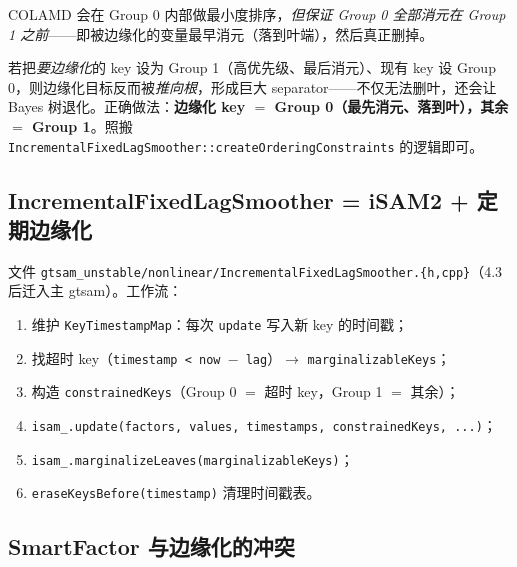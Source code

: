 \noindent COLAMD 会在 Group 0 内部做最小度排序，\emph{但保证 Group 0 全部消元在 Group 1 之前}——即被边缘化的变量最早消元（落到叶端），然后真正删掉。

\begin{pitfall}
若把\emph{要边缘化}的 key 设为 Group 1（高优先级、最后消元）、现有 key 设 Group 0，则边缘化目标反而被\emph{推向根}，形成巨大 separator——不仅无法删叶，还会让 Bayes 树退化。正确做法：\textbf{边缘化 key $=$ Group 0（最先消元、落到叶），其余 $=$ Group 1}。照搬 \texttt{IncrementalFixedLagSmoother::createOrderingConstraints} 的逻辑即可。
\end{pitfall}

\subsection{IncrementalFixedLagSmoother = iSAM2 + 定期边缘化}
\label{sec:isam-fixedlag}

文件 \texttt{gtsam\_unstable/nonlinear/IncrementalFixedLagSmoother.\{h,cpp\}}（4.3 后迁入主 gtsam）。工作流：
\begin{enumerate}
  \item 维护 \texttt{KeyTimestampMap}：每次 \texttt{update} 写入新 key 的时间戳；
  \item 找超时 key（\texttt{timestamp < now $-$ lag}）$\to$ \texttt{marginalizableKeys}；
  \item 构造 \texttt{constrainedKeys}（Group 0 $=$ 超时 key，Group 1 $=$ 其余）；
  \item \texttt{isam\_.update(factors, values, timestamps, constrainedKeys, ...)}；
  \item \texttt{isam\_.marginalizeLeaves(marginalizableKeys)}；
  \item \texttt{eraseKeysBefore(timestamp)} 清理时间戳表。
\end{enumerate}

\subsection{SmartFactor 与边缘化的冲突}
\label{sec:isam-smartfactor}

